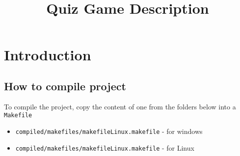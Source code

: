\documentclass[a4paper,12pt]{article}
\title{Quiz Game Description}
\author{}
\date{}
\begin{document}
\maketitle

\section{Introduction}
\subsection{How to compile project}
To compile the project, copy the content of one from the folders below into a \texttt{Makefile}
\begin{itemize}
    \item \texttt{compiled/makefiles/makefileLinux.makefile} - for windows
    \item \texttt{compiled/makefiles/makefileLinux.makefile} - for Linux
\end{itemize}


\end{document}
